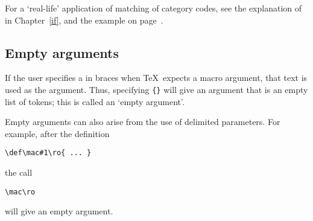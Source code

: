 For a `real-life' application of matching of category codes,
see the explanation of  in Chapter~\ref{if},
and the example on page~\pageref{ex:jobnumber}.


\subsection{Empty arguments}

If the user specifies a  in braces
when \TeX\ expects a macro
argument, that text is used as the argument.
Thus, specifying \verb-{}- will give an argument that is
an empty list of tokens; this is called an `empty argument'.

Empty arguments can also arise from the use of delimited
parameters. For example, after the definition
\begin{verbatim}
\def\mac#1\ro{ ... }
\end{verbatim}
the call
\begin{verbatim}
\mac\ro
\end{verbatim}
will give an empty argument. 


